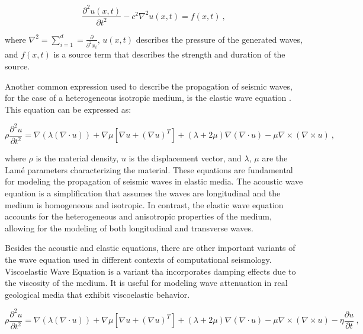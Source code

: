 \documentclass[11pt,twoside]{article}
\begin{document}
\begin{equation*}
\frac{\partial^2 u(x, t)}{\partial t^2} - c^{2} \nabla^2 u(x, t) = f(x, t) \ ,
\label{acoustic}
\end{equation*}

where $\nabla^2 = \sum_{i=1}^{d} = \frac{\partial}{\partial^{2} x_{i}}$, \( u(x, t) \) describes the pressure of 
the generated waves, and \( f(x, t) \) is a source term that describes the strength and duration of the source.

Another common expression used to describe the propagation of seismic waves, for the case of a heterogeneous 
isotropic medium, is the elastic wave equation \citep{moseley_fast_2018, lehmann_fourier_2023}. This equation can 
be expressed as:

\begin{equation*}
\rho \frac{\partial^2 u}{\partial t^2} = \nabla (\lambda (\nabla \cdot u)) + \nabla \mu \left[\nabla u 
+ (\nabla u)^T\right] + (\lambda + 2\mu) \nabla (\nabla \cdot u) - \mu \nabla \times (\nabla \times u) \ ,
\label{elastic}
\end{equation*}

where $\rho$ is the material density, $u$ is the displacement vector, and $\lambda$, $\mu$ are the Lamé parameters 
characterizing the material. These equations are fundamental for modeling the propagation of seismic waves in 
elastic media. The acoustic wave equation is a simplification that assumes the waves are longitudinal and the 
medium is homogeneous and isotropic. In contrast, the elastic wave equation accounts for the heterogeneous 
and anisotropic properties of the medium, allowing for the modeling of both longitudinal and transverse waves.

Besides the acoustic and elastic equations, there are other important variants of the wave equation used in different 
contexts of computational seismology. Viscoelastic Wave Equation is a variant tha incorporates damping effects due to 
the viscosity of the medium. It is useful for modeling wave attenuation in real geological media that exhibit 
viscoelastic behavior.

\begin{equation*}
\rho \frac{\partial^2 u}{\partial t^2} = \nabla (\lambda (\nabla \cdot u)) + \nabla \mu \left[\nabla u + 
(\nabla u)^T\right] + (\lambda + 2\mu) \nabla (\nabla \cdot u) - \mu \nabla \times (\nabla \times u) - 
\eta \frac{\partial u}{\partial t} \ ,
\label{viscoelastic}
\end{equation*}
    
\end{document}
